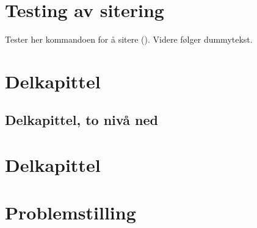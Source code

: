 
\section{Testing av sitering}
Tester her kommandoen for å sitere (\cite{latex}). Videre følger dummytekst.

\section{Delkapittel}
\kant[7]
\subsection{Delkapittel, to nivå ned}
\kant[8]

\section{Delkapittel}
\kant[9-10]

\section{Problemstilling}
\kant[11-15]
